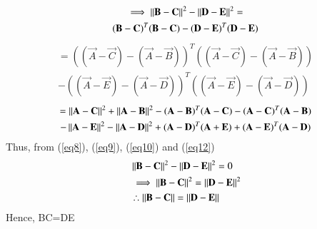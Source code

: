\documentclass[journal,12pt,twocolumn]{IEEEtran}
\begin{document}
\begin{multline}
\implies \left\lVert\mathbf{B}-\mathbf{C}\right\rVert^2 - \left\lVert\mathbf{D}-\mathbf{E}\right\rVert^2=\\
(\mathbf B -\mathbf C)^T(\mathbf{B}-\mathbf{C})-(\mathbf D -\mathbf E)^T(\mathbf{D}-\mathbf{E})\label{eq13}
\end{multline}
\begin{multline}
=((\vec A -\vec C)-(\vec A -\vec B))^T((\vec A -\vec C)-(\vec A -\vec B))\\-((\vec A -\vec E)-(\vec A -\vec D))^T((\vec A -\vec E)-(\vec A -\vec D))\label{eq14}
\end{multline}
\begin{multline}
=\left\lVert\mathbf{A}-\mathbf{C}\right\rVert^2 + \left\lVert\mathbf{A}-\mathbf{B}\right\rVert^2- (\mathbf A -\mathbf B)^T(\mathbf{A}-\mathbf{C})-(\mathbf{A}-\mathbf{C})^T(\mathbf{A}-\mathbf{B})\\
-\left\lVert\mathbf{A}-\mathbf{E}\right\rVert^2 - \left\lVert\mathbf{A}-\mathbf{D}\right\rVert^2+ (\mathbf A -\mathbf D)^T(\mathbf{A}+\mathbf{E})+(\mathbf{A}-\mathbf{E})^T(\mathbf{A}-\mathbf{D})\label{eq15}
\end{multline}
Thus, from (\ref{eq8}), (\ref{eq9}), (\ref{eq10}) and (\ref{eq12})
\begin{align}
& \left\lVert\mathbf{B}-\mathbf{C}\right\rVert^2 - \left\lVert\mathbf{D}-\mathbf{E}\right\rVert^2=0\label{eq16}\\ 
& \implies \left\lVert\mathbf{B}-\mathbf{C}\right\rVert^2 = \left\lVert\mathbf{D}-\mathbf{E}\right\rVert^2 \label{eq17}\\
	& \therefore\left\lVert\mathbf{B}-\mathbf{C}\right\rVert = \left\lVert\mathbf{D}-\mathbf{E}\right\rVert\label{eq18}
\end{align}
Hence, BC=DE
\end{document}
